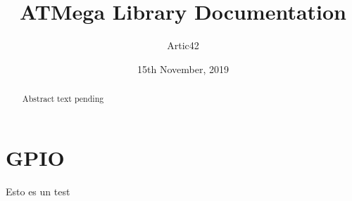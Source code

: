 \documentclass[a4paper]{report}
\author {Artic42}
\title {ATMega Library Documentation}
\date {15th November, 2019}
\begin{document}
	
	\maketitle

	\begin{abstract}
		Abstract text pending
	\end{abstract}

\chapter{GPIO}
	Esto es un test
\end{document}
